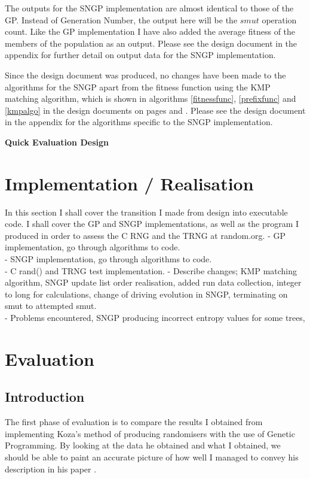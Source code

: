 \documentclass[a4paper,10.5pt]{article}
\begin{document}
The outputs for the SNGP implementation are almost identical to those of the GP. Instead of Generation Number, the output here will be the $smut$ operation count. Like the GP implementation I have also added the average fitness of the members of the population as an output. Please see the design document in the appendix for further detail on output data for the SNGP implementation.

Since the design document was produced, no changes have been made to the algorithms for the SNGP apart from the fitness function using the KMP matching algorithm, which is shown in algorithms \ref{fitnessfunc}, \ref{prefixfunc} and \ref{kmpalgo} in the design documents on pages \pageref{kmpalgo} and \pageref{fitnessfunc}. Please see the design document in the appendix for the algorithms specific to the SNGP implementation.

\textbf{Quick Evaluation Design}
\newpage
\section{Implementation / Realisation}
In this section I shall cover the transition I made from design into executable code. I shall cover the GP and SNGP implementations, as well as the program I produced in order to assess the C RNG and the TRNG at random.org.
- GP implementation, go through algorithms to code.\\
- SNGP implementation, go through algorithms to code.\\
- C rand() and TRNG test implementation. 
- Describe changes; KMP matching algorithm, SNGP update list order realisation, added run data collection, integer to long for calculations, change of driving evolution in SNGP, terminating on smut to attempted smut. \\
- Problems encountered, SNGP producing incorrect entropy values for some trees, 



\newpage
\section{Evaluation}

\subsection{Introduction}
The first phase of evaluation is to compare the results I obtained from implementing Koza's method of producing randomisers with the use of Genetic Programming. By looking at the data he obtained and what I obtained, we should be able to paint an accurate picture of how well I managed to convey his description in his paper \cite{kozarng}.
\end{document}
